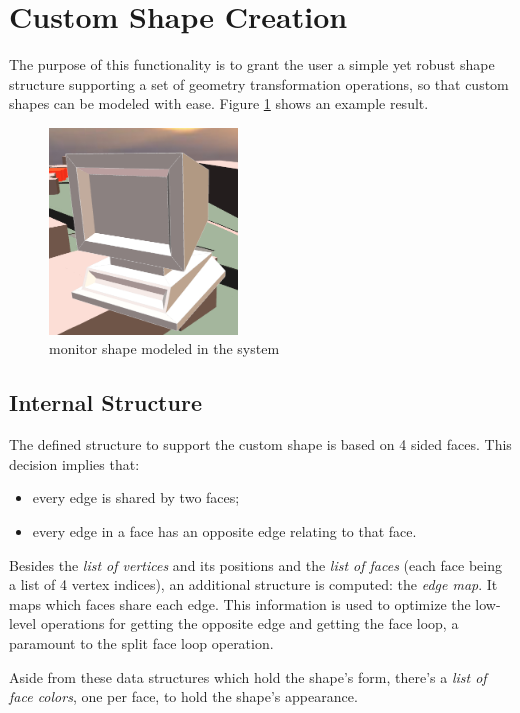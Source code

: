 
\section{Custom Shape Creation}

The purpose of this functionality is to grant the user a simple yet robust shape
structure supporting a set of geometry transformation operations,
so that custom shapes can be modeled with ease. Figure \ref{fig:example} shows an example result.

\begin{figure}[!ht]
	\centering
	\includegraphics[width=5cm]{gfx/ex-monitor.png}
	\caption{monitor shape modeled in the system}
	\label{fig:example}
\end{figure}

\subsection{Internal Structure}

The defined structure to support the custom shape is based on 4 sided faces.
This decision implies that:
\begin{itemize}
	\item every edge is shared by two faces;
	\item every edge in a face has an opposite edge relating to that face.
\end{itemize}

Besides the \emph{list of vertices} and its positions and the \emph{list of faces}
(each face being a list of 4 vertex indices),
an additional structure is computed: the \emph{edge map}.
It maps which faces share each edge.
This information is used to optimize the low-level operations for
getting the opposite edge and getting the face loop,
a	paramount to the split face loop operation.

Aside from these data structures which hold the shape's form,
there's a \emph{list of face colors}, one per face, to hold the shape's appearance.

